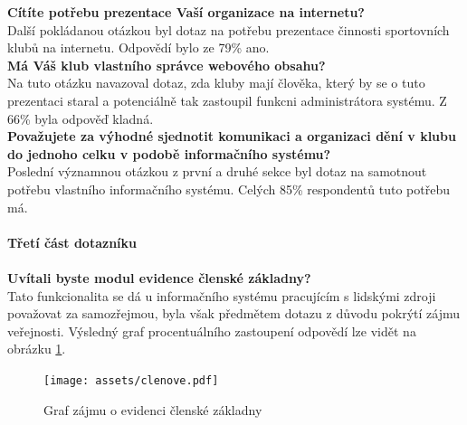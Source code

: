 \documentclass[11pt,oneside]{fithesis}
\begin{document}
                \noindent
                \textbf{Cítíte potřebu prezentace Vaší organizace na internetu?}\\
                Další pokládanou otázkou byl dotaz na potřebu prezentace činnosti sportovních klubů na internetu. Odpovědí bylo ze 79\% ano. \\

                \noindent
                \textbf{Má Váš klub vlastního správce webového obsahu?}\\
                Na tuto otázku navazoval dotaz, zda kluby mají člověka, který by se o tuto prezentaci staral a potenciálně tak zastoupil funkcni administrátora systému. Z 66\% byla odpověď kladná.\\

                \noindent
                \textbf{Považujete za výhodné sjednotit komunikaci a organizaci dění v klubu do jednoho celku v
                podobě informačního systému?}\\
                Poslední významnou otázkou z první a druhé sekce byl dotaz na samotnout potřebu vlastního informačního systému. Celých 85\% respondentů tuto potřebu má.\\


                \paragraph*{Třetí část dotazníku}

                \paragraph*{}

                \noindent
                \textbf{Uvítali byste modul evidence členské základny?}\\
                Tato funkcionalita se dá u informačního systému pracujícím s lidskými zdroji považovat za samozřejmou, byla však předmětem dotazu z důvodu pokrýtí zájmu veřejnosti. Výsledný graf procentuálního zastoupení odpovědí lze vidět na obrázku \ref{anal-zakladna}.\\
                \begin{figure}
                \centering
                \mbox{\texttt{[image: assets/clenove.pdf]} }
                \caption{Graf zájmu o evidenci členské základny \label{anal-zakladna}}
                \end{figure}
\end{document}
